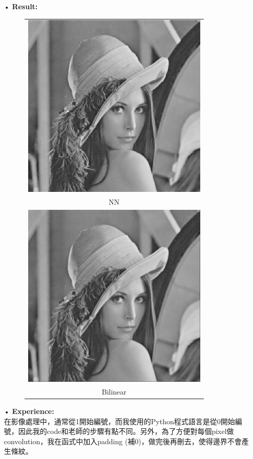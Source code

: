 \documentclass[12pt,a4paper]{article}
\begin{document}
\begin{enumerate}
\newpage
\item[•]
{\bf Result:}
\begin{figure}[h]
\hspace*{7.5em}
\begin{tabular}{c}
\includegraphics[height=3.5in]{img_NN.jpg}\\
NN \vspace*{0.2em}\\
\includegraphics[height=3.5in]{img_Bilinear.jpg}\\
Bilinear
\end{tabular}
\end{figure} 

\newpage
\item[•]
{\bf Experience:}\\
在影像處理中，通常從1開始編號，而我使用的Python程式語言是從0開始編號，因此我的code和老師的步驟有點不同。另外，為了方便對每個pixel做convolution，我在函式中加入padding (補0)，做完後再刪去，使得邊界不會產生條紋。
\end{enumerate}
\end{document}
